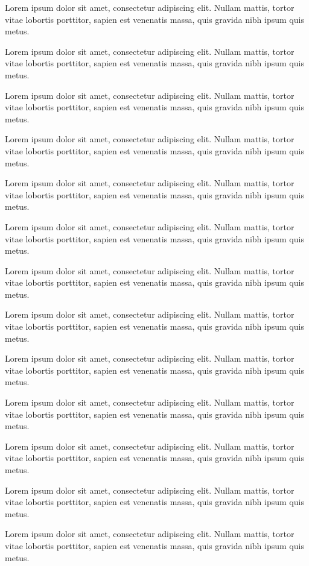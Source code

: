 \documentclass[twoside,a4paper]{article}
\begin{document}
{Lorem ipsum dolor sit amet, consectetur adipiscing elit. Nullam mattis, tortor vitae lobortis porttitor, sapien est venenatis massa, quis gravida nibh ipsum quis metus. 

Lorem ipsum dolor sit amet, consectetur adipiscing elit. Nullam mattis, tortor vitae lobortis porttitor, sapien est venenatis massa, quis gravida nibh ipsum quis metus. 

Lorem ipsum dolor sit amet, consectetur adipiscing elit. Nullam mattis, tortor vitae lobortis porttitor, sapien est venenatis massa, quis gravida nibh ipsum quis metus. 

Lorem ipsum dolor sit amet, consectetur adipiscing elit. Nullam mattis, tortor vitae lobortis porttitor, sapien est venenatis massa, quis gravida nibh ipsum quis metus. 

Lorem ipsum dolor sit amet, consectetur adipiscing elit. Nullam mattis, tortor vitae lobortis porttitor, sapien est venenatis massa, quis gravida nibh ipsum quis metus. 

Lorem ipsum dolor sit amet, consectetur adipiscing elit. Nullam mattis, tortor vitae lobortis porttitor, sapien est venenatis massa, quis gravida nibh ipsum quis metus. 

Lorem ipsum dolor sit amet, consectetur adipiscing elit. Nullam mattis, tortor vitae lobortis porttitor, sapien est venenatis massa, quis gravida nibh ipsum quis metus. 

Lorem ipsum dolor sit amet, consectetur adipiscing elit. Nullam mattis, tortor vitae lobortis porttitor, sapien est venenatis massa, quis gravida nibh ipsum quis metus. 

Lorem ipsum dolor sit amet, consectetur adipiscing elit. Nullam mattis, tortor vitae lobortis porttitor, sapien est venenatis massa, quis gravida nibh ipsum quis metus. 

Lorem ipsum dolor sit amet, consectetur adipiscing elit. Nullam mattis, tortor vitae lobortis porttitor, sapien est venenatis massa, quis gravida nibh ipsum quis metus. 

Lorem ipsum dolor sit amet, consectetur adipiscing elit. Nullam mattis, tortor vitae lobortis porttitor, sapien est venenatis massa, quis gravida nibh ipsum quis metus. 

Lorem ipsum dolor sit amet, consectetur adipiscing elit. Nullam mattis, tortor vitae lobortis porttitor, sapien est venenatis massa, quis gravida nibh ipsum quis metus. 

Lorem ipsum dolor sit amet, consectetur adipiscing elit. Nullam mattis, tortor vitae lobortis porttitor, sapien est venenatis massa, quis gravida nibh ipsum quis metus. 

}
\end{document}
